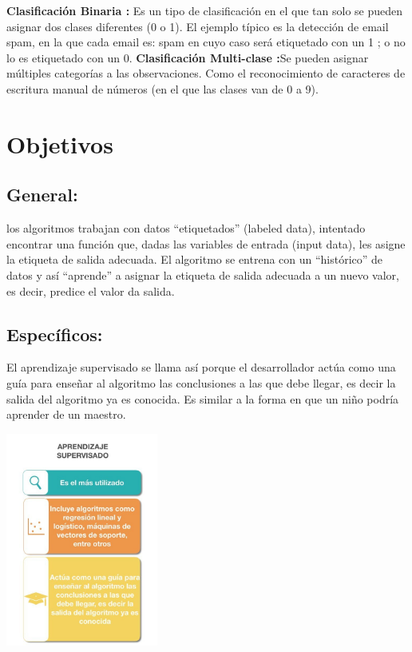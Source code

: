 \documentclass[%
 reprint,
 amsmath,amssymb,
 aps,
]{revtex4-1}
\begin{document}
 \textbf{Clasificación Binaria :} Es un tipo de clasificación en el que tan solo se pueden asignar dos clases diferentes (0 o 1). El ejemplo típico es la detección de email spam, en la que cada email es: spam  en cuyo caso será etiquetado con un 1 ; o no lo es  etiquetado con un 0.
  \textbf{Clasificación Multi-clase :}Se pueden asignar múltiples categorías a las observaciones. Como el reconocimiento de caracteres de escritura manual de números (en el que las clases van de 0 a 9).

 
\section{Objetivos}\label{sec:2}
\subsection{General:}
los algoritmos trabajan con datos “etiquetados” (labeled data), intentado encontrar una función que, dadas las variables de entrada (input data), les asigne la etiqueta de salida adecuada. El algoritmo se entrena con un “histórico” de datos y así “aprende” a asignar la etiqueta de salida adecuada a un nuevo valor, es decir, predice el valor da salida.
\subsection{Específicos:}
El aprendizaje supervisado se llama así porque el desarrollador actúa como una guía para enseñar al algoritmo las conclusiones a las que debe llegar, es decir la salida del algoritmo ya es conocida. Es similar a la forma en que un niño podría aprender de un maestro.
 \begin{center}
\includegraphics[width=5cm]{./Imagenes/objetivoprincipal}
\end{center}
\end{document}
